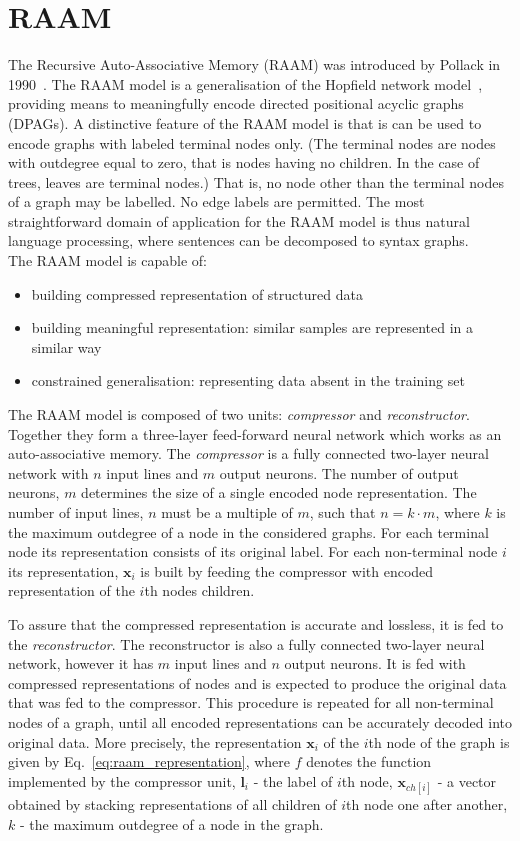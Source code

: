 \section{RAAM}
The Recursive Auto-Associative Memory (RAAM) was introduced by Pollack in 1990~\cite{pollack1990recursive}. The RAAM model is a generalisation of the Hopfield network model~\cite{goulon2005hopfield}, providing means to meaningfully encode directed positional acyclic graphs (DPAGs). A distinctive feature of the RAAM model is that is can be used to encode graphs with labeled terminal nodes only. (The terminal nodes are nodes with outdegree equal to zero, that is nodes having no children. In the case of trees, leaves are terminal nodes.) That is, no node other than the terminal nodes of a graph may be labelled. No edge labels are permitted. The most straightforward domain of application for the RAAM model is thus natural language processing, where sentences can be decomposed to syntax graphs.\\
\noindent The RAAM model is capable of:
\begin{itemize}
	\item building compressed representation of structured data
	\item building meaningful representation: similar samples are represented in a similar way
	\item constrained generalisation: representing data absent in the training set
\end{itemize}
The RAAM model is composed of two units: \emph{compressor} and \emph{reconstructor}. Together they form a three-layer feed-forward neural network which works as an auto-associative memory. The \emph{compressor} is a fully connected two-layer neural network with $n$ input lines and $m$ output neurons. The number of output neurons, $m$ determines the size of a single encoded node representation. The number of input lines, $n$ must be a multiple of $m$, such that $n = k \cdot m$, where $k$ is the maximum outdegree of a node in the considered graphs. For each terminal node its representation consists of its original label. For each non-terminal node $i$ its representation, $\bm{x}_i$ is built by feeding the compressor with encoded representation of the $i$th nodes children.

To assure that the compressed representation is accurate and lossless, it is fed to the \emph{reconstructor}. The reconstructor is also a fully connected two-layer neural network, however it has $m$ input lines and $n$ output neurons. It is fed with compressed representations of nodes and is expected to produce the original data that was fed to the compressor. This procedure is repeated for all non-terminal nodes of a graph, until all encoded representations can be accurately decoded into original data. More precisely, the representation $\bm{x}_i$ of the $i$th node of the graph is given by Eq.~\ref{eq:raam_representation}, where $f$ denotes the function implemented by the compressor unit, $\bm{l}_i$ - the label of $i$th node, $\bm{x}_{ch[i]}$ - a vector obtained by stacking representations of all children of $i$th node one after another, $k$ - the maximum outdegree of a node in the graph.


